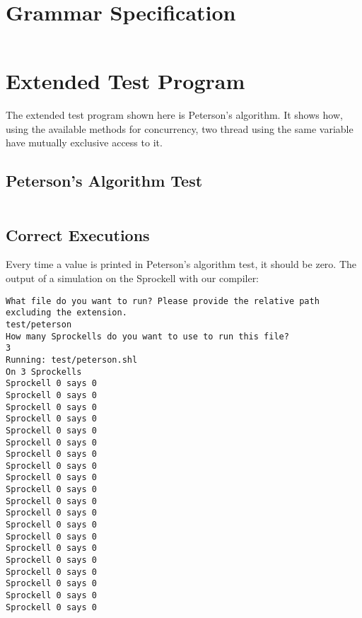 \documentclass[twoside]{report}
\begin{document}
\begin{appendices}
\label{appendices}


\chapter{Grammar Specification}
\label{grammar_specification}
\begin{landscape}
\inputminted[firstline=66, lastline=142, tabsize=4]{haskell}{../../src/haskell/PP-project-2017/Grammar.hs}
\end{landscape}


\chapter{Extended Test Program}
\label{extended_test_program}
The extended test program shown here is Peterson's algorithm. It shows how, using the available methods for concurrency, two thread using the same variable have mutually exclusive access to it.

\section{Peterson's Algorithm Test}
\inputminted[tabsize=4,linenos,firstnumber=1]{text}{../../src/haskell/PP-project-2017/test/peterson.shl}

\section{Correct Executions}
Every time a value is printed in Peterson's algorithm test, it should be zero. The output of a simulation on the Sprockell with our compiler:
\begin{verbatim}
What file do you want to run? Please provide the relative path excluding the extension.
test/peterson
How many Sprockells do you want to use to run this file?
3
Running: test/peterson.shl
On 3 Sprockells
Sprockell 0 says 0
Sprockell 0 says 0
Sprockell 0 says 0
Sprockell 0 says 0
Sprockell 0 says 0
Sprockell 0 says 0
Sprockell 0 says 0
Sprockell 0 says 0
Sprockell 0 says 0
Sprockell 0 says 0
Sprockell 0 says 0
Sprockell 0 says 0
Sprockell 0 says 0
Sprockell 0 says 0
Sprockell 0 says 0
Sprockell 0 says 0
Sprockell 0 says 0
Sprockell 0 says 0
Sprockell 0 says 0
Sprockell 0 says 0
\end{verbatim}


\end{appendices}
\end{document}

